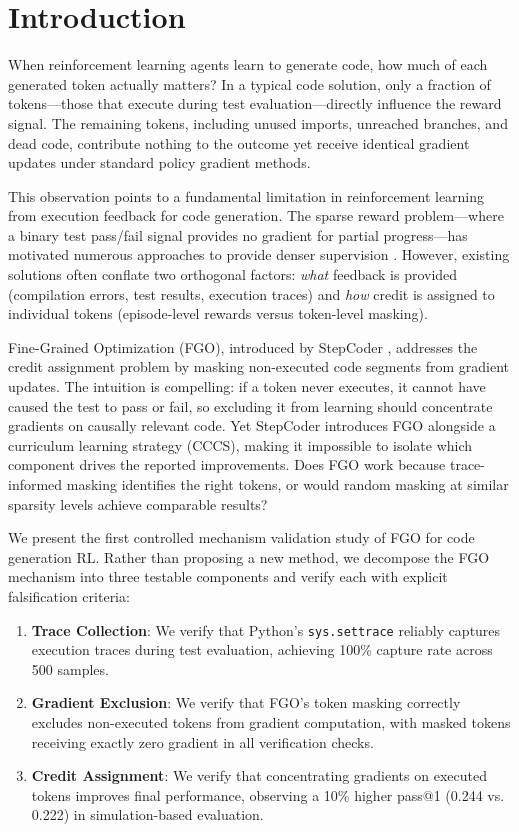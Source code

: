 \section{Introduction}

When reinforcement learning agents learn to generate code, how much of each generated token actually matters? In a typical code solution, only a fraction of tokens---those that execute during test evaluation---directly influence the reward signal. The remaining tokens, including unused imports, unreached branches, and dead code, contribute nothing to the outcome yet receive identical gradient updates under standard policy gradient methods.

This observation points to a fundamental limitation in reinforcement learning from execution feedback for code generation. The sparse reward problem---where a binary test pass/fail signal provides no gradient for partial progress---has motivated numerous approaches to provide denser supervision \citep{shojaee2023ppo, dou2024stepcoder, jing2026rlpf}. However, existing solutions often conflate two orthogonal factors: \emph{what} feedback is provided (compilation errors, test results, execution traces) and \emph{how} credit is assigned to individual tokens (episode-level rewards versus token-level masking).

Fine-Grained Optimization (FGO), introduced by StepCoder \citep{dou2024stepcoder}, addresses the credit assignment problem by masking non-executed code segments from gradient updates. The intuition is compelling: if a token never executes, it cannot have caused the test to pass or fail, so excluding it from learning should concentrate gradients on causally relevant code. Yet StepCoder introduces FGO alongside a curriculum learning strategy (CCCS), making it impossible to isolate which component drives the reported improvements. Does FGO work because trace-informed masking identifies the right tokens, or would random masking at similar sparsity levels achieve comparable results?

We present the first controlled mechanism validation study of FGO for code generation RL. Rather than proposing a new method, we decompose the FGO mechanism into three testable components and verify each with explicit falsification criteria:

\begin{enumerate}
    \item \textbf{Trace Collection}: We verify that Python's \texttt{sys.settrace} reliably captures execution traces during test evaluation, achieving 100\% capture rate across 500 samples.

    \item \textbf{Gradient Exclusion}: We verify that FGO's token masking correctly excludes non-executed tokens from gradient computation, with masked tokens receiving exactly zero gradient in all verification checks.

    \item \textbf{Credit Assignment}: We verify that concentrating gradients on executed tokens improves final performance, observing a 10\% higher pass@1 (0.244 vs. 0.222) in simulation-based evaluation.
\end{enumerate}


